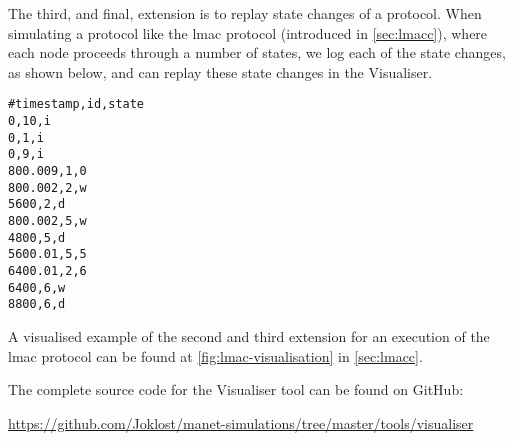 The third, and final, extension is to replay state changes of a protocol. When simulating a protocol like the
\gls{lmac} protocol (introduced in \autoref{sec:lmacc}), where each node proceeds through a number of states,
we log each of the state changes, as shown below, and can replay these state changes in the Visualiser.
%
\begin{verbatim}
#timestamp,id,state
0,10,i
0,1,i
0,9,i
800.009,1,0
800.002,2,w
5600,2,d
800.002,5,w
4800,5,d
5600.01,5,5
6400.01,2,6
6400,6,w
8800,6,d
\end{verbatim}

A visualised example of the second and third extension for an execution of the \gls{lmac} protocol can be
found at \autoref{fig:lmac-visualisation} in \autoref{sec:lmacc}.


The complete source code for the Visualiser tool can be found on GitHub:

{\small \url{https://github.com/Joklost/manet-simulations/tree/master/tools/visualiser}}
%